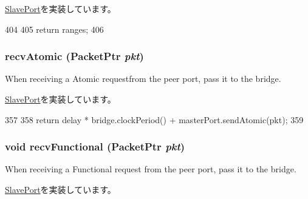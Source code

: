 \hyperlink{classSlavePort_a6e967f8921e80748eb2be35b6b481a7e}{SlavePort}を実装しています。


\begin{DoxyCode}
404 {
405     return ranges;
406 }
\end{DoxyCode}
\hypertarget{classBridge_1_1BridgeSlavePort_a5f0b4c4a94f6b0053f9d7a4eb9c2518a}{
\subsubsection[{recvAtomic}]{ recvAtomic ({\bf PacketPtr} {\em pkt})}}
\label{classBridge_1_1BridgeSlavePort_a5f0b4c4a94f6b0053f9d7a4eb9c2518a}
When receiving a Atomic requestfrom the peer port, pass it to the bridge. 

\hyperlink{classSlavePort_a428ab07671bc9372dc44a2487b12a726}{SlavePort}を実装しています。


\begin{DoxyCode}
357 {
358     return delay * bridge.clockPeriod() + masterPort.sendAtomic(pkt);
359 }
\end{DoxyCode}
\hypertarget{classBridge_1_1BridgeSlavePort_aeefa907fb6d6a787e6dab90e8138ea90}{
\subsubsection[{recvFunctional}]{\setlength{\rightskip}{0pt plus 5cm}void recvFunctional ({\bf PacketPtr} {\em pkt})}}
\label{classBridge_1_1BridgeSlavePort_aeefa907fb6d6a787e6dab90e8138ea90}
When receiving a Functional request from the peer port, pass it to the bridge. 

\hyperlink{classSlavePort_a6a3d6f2e5dab6bed16d53d9e7c17378d}{SlavePort}を実装しています。


